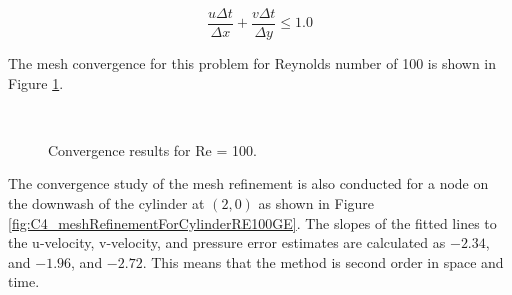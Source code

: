\begin{equation}\label{eq:C4_CFLnumber}
	\frac{u \Delta t}{\Delta x} + \frac{v \Delta t}{\Delta y} \leq 1.0
\end{equation}


The mesh convergence for this problem for Reynolds number of 100 is shown in Figure \ref{fig:C4_meshConvergenceForCylidnerRE100GE}.

\begin{figure}[H]
    \centering
    \quad
    \\
    \caption{Convergence results for Re = 100.}
    \label{fig:C4_meshConvergenceForCylidnerRE100GE}
\end{figure}

The convergence study of the mesh refinement is also conducted for a node on the downwash of the cylinder at $(2, 0)$ as shown in Figure \ref{fig:C4_meshRefinementForCylinderRE100GE}. The slopes of the fitted lines to the u-velocity, v-velocity, and pressure error estimates are calculated as $-2.34$, and $-1.96$, and $-2.72$. This means that the method is second order in space and time.

